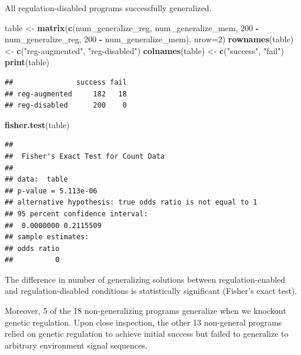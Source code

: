 \documentclass[]{book}
\newenvironment{Shaded}{\begin{snugshade}}{\end{snugshade}}
\newcommand{\DataTypeTok}[1]{\textcolor[rgb]{0.13,0.29,0.53}{#1}}
\newcommand{\DecValTok}[1]{\textcolor[rgb]{0.00,0.00,0.81}{#1}}
\newcommand{\KeywordTok}[1]{\textcolor[rgb]{0.13,0.29,0.53}{\textbf{#1}}}
\newcommand{\NormalTok}[1]{#1}
\newcommand{\OperatorTok}[1]{\textcolor[rgb]{0.81,0.36,0.00}{\textbf{#1}}}
\newcommand{\StringTok}[1]{\textcolor[rgb]{0.31,0.60,0.02}{#1}}
\begin{document}
All regulation-disabled programs successfully generalized.

\begin{Shaded}
\begin{Highlighting}[]
\NormalTok{table <-}\StringTok{ }\KeywordTok{matrix}\NormalTok{(}\KeywordTok{c}\NormalTok{(num_generalize_reg,}
\NormalTok{                  num_generalize_mem,}
                  \DecValTok{200} \OperatorTok{-}\StringTok{ }\NormalTok{num_generalize_reg,}
                  \DecValTok{200} \OperatorTok{-}\StringTok{ }\NormalTok{num_generalize_mem),}
                \DataTypeTok{nrow=}\DecValTok{2}\NormalTok{)}
\KeywordTok{rownames}\NormalTok{(table) <-}\StringTok{ }\KeywordTok{c}\NormalTok{(}\StringTok{"reg-augmented"}\NormalTok{, }\StringTok{"reg-disabled"}\NormalTok{)}
\KeywordTok{colnames}\NormalTok{(table) <-}\StringTok{ }\KeywordTok{c}\NormalTok{(}\StringTok{"success"}\NormalTok{, }\StringTok{"fail"}\NormalTok{)}
\KeywordTok{print}\NormalTok{(table)}
\end{Highlighting}
\end{Shaded}

\begin{verbatim}
##               success fail
## reg-augmented     182   18
## reg-disabled      200    0
\end{verbatim}

\begin{Shaded}
\begin{Highlighting}[]
\KeywordTok{fisher.test}\NormalTok{(table)}
\end{Highlighting}
\end{Shaded}

\begin{verbatim}
## 
##  Fisher's Exact Test for Count Data
## 
## data:  table
## p-value = 5.113e-06
## alternative hypothesis: true odds ratio is not equal to 1
## 95 percent confidence interval:
##  0.0000000 0.2115509
## sample estimates:
## odds ratio 
##          0
\end{verbatim}

The difference in number of generalizing solutions between regulation-enabled and regulation-disabled conditions is statistically significant (Fisher's exact test).

Moreover, 5 of the 18 non-generalizing programs generalize when we knockout genetic regulation.
Upon close inspection, the other 13 non-general programs relied on genetic regulation to achieve initial success but failed to generalize to arbitrary environment signal sequences.
\end{document}
